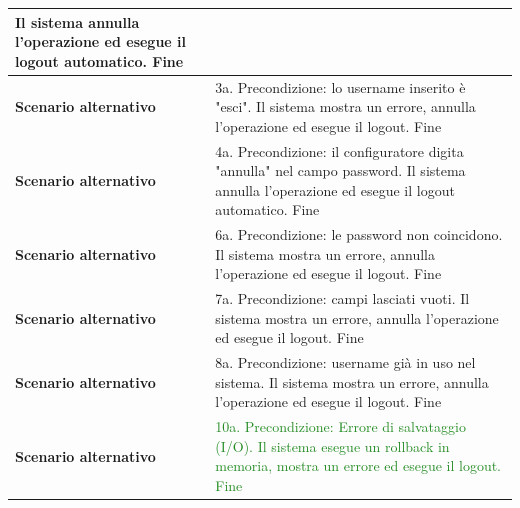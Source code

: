 \documentclass[12pt, a4paper, oneside]{report}
\begin{document}
\begin{tabularx}{\textwidth}{|l|X|}
    Il sistema annulla l'operazione ed esegue il logout automatico.\newline
    Fine \\ \hline
    \textbf{Scenario alternativo} & 
    3a. Precondizione: lo username inserito è "esci".\newline
    Il sistema mostra un errore, annulla l'operazione ed esegue il logout.\newline
    Fine \\ \hline
    \textbf{Scenario alternativo} & 
    4a. Precondizione: il configuratore digita "annulla" nel campo password.\newline
    Il sistema annulla l'operazione ed esegue il logout automatico.\newline
    Fine \\ \hline
    \textbf{Scenario alternativo} & 
    6a. Precondizione: le password non coincidono.\newline
    Il sistema mostra un errore, annulla l'operazione ed esegue il logout.\newline
    Fine \\ \hline
    \textbf{Scenario alternativo} & 
    7a. Precondizione: campi lasciati vuoti.\newline
    Il sistema mostra un errore, annulla l'operazione ed esegue il logout.\newline
    Fine \\ \hline
    \textbf{Scenario alternativo} & 
    8a. Precondizione: username già in uso nel sistema.\newline
    Il sistema mostra un errore, annulla l'operazione ed esegue il logout.\newline
    Fine \\ \hline
    \textbf{Scenario alternativo} & 
    \textcolor{ForestGreen}{10a. Precondizione: Errore di salvataggio (I/O).}\newline
    \textcolor{ForestGreen}{Il sistema esegue un rollback in memoria, mostra un errore ed esegue il logout.}\newline
    \textcolor{ForestGreen}{Fine} \\ \hline
\end{tabularx}

\renewcommand{\arraystretch}{1.4} 
\end{document}

